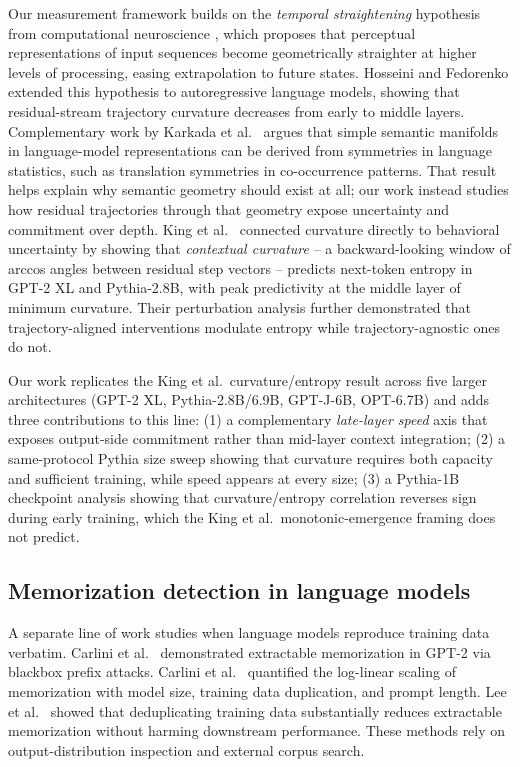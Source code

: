 \documentclass[11pt,letterpaper]{article}
\begin{document}
Our measurement framework builds on the \emph{temporal straightening}
hypothesis from computational neuroscience
\cite{henaff2019straightening,henaff2021primary}, which proposes that
perceptual representations of input sequences become geometrically
straighter at higher levels of processing, easing extrapolation to
future states. Hosseini and Fedorenko \cite{hosseini2023straightening}
extended this hypothesis to autoregressive language models, showing
that residual-stream trajectory curvature decreases from early to
middle layers. Complementary work by Karkada et al.\
\cite{karkada2026symmetry} argues that simple semantic manifolds in
language-model representations can be derived from symmetries in
language statistics, such as translation symmetries in co-occurrence
patterns. That result helps explain why semantic geometry should exist
at all; our work instead studies how residual trajectories through that
geometry expose uncertainty and commitment over depth. King et al.\
\cite{king2026curvature} connected curvature
directly to behavioral uncertainty by showing that \emph{contextual
curvature} -- a backward-looking window of arccos angles between
residual step vectors -- predicts next-token entropy in GPT-2 XL and
Pythia-2.8B, with peak predictivity at the middle layer of minimum
curvature. Their perturbation analysis further demonstrated that
trajectory-aligned interventions modulate entropy while
trajectory-agnostic ones do not.

Our work replicates the King et al.\ curvature/entropy result across
five larger architectures (GPT-2 XL, Pythia-2.8B/6.9B, GPT-J-6B,
OPT-6.7B) and adds three contributions to this line: (1) a complementary
\emph{late-layer speed} axis that exposes output-side commitment rather
than mid-layer context integration; (2) a same-protocol Pythia size
sweep showing that curvature requires both capacity and sufficient
training, while speed appears at every size; (3) a Pythia-1B checkpoint
analysis showing that curvature/entropy correlation reverses sign during
early training, which the King et al.\ monotonic-emergence framing does
not predict.

\subsection{Memorization detection in language models}

A separate line of work studies when language models reproduce training
data verbatim. Carlini et al.\ \cite{carlini2021extracting} demonstrated
extractable memorization in GPT-2 via blackbox prefix attacks. Carlini
et al.\ \cite{carlini2022quantifying} quantified the log-linear scaling
of memorization with model size, training data duplication, and prompt
length. Lee et al.\ \cite{lee2022deduplicating} showed that
deduplicating training data substantially reduces extractable
memorization without harming downstream performance. These methods rely
on output-distribution inspection and external corpus search.
\end{document}

